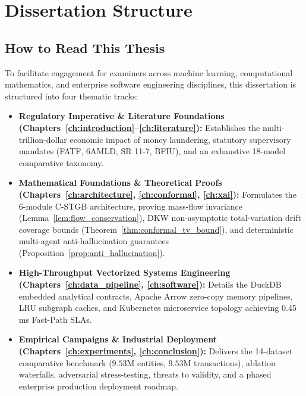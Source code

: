 \section{Dissertation Structure}

\subsection{How to Read This Thesis}
To facilitate engagement for examiners across machine learning, computational mathematics, and enterprise software engineering disciplines, this dissertation is structured into four thematic tracks:
\begin{itemize}
    \item \textbf{Regulatory Imperative \& Literature Foundations (Chapters~\ref{ch:introduction}--\ref{ch:literature}):} Establishes the multi-trillion-dollar economic impact of money laundering, statutory supervisory mandates (FATF, 6AMLD, SR 11-7, BFIU), and an exhaustive 18-model comparative taxonomy.
    \item \textbf{Mathematical Foundations \& Theoretical Proofs (Chapters~\ref{ch:architecture}, \ref{ch:conformal}, \ref{ch:xai}):} Formulates the 6-module C-STGB architecture, proving mass-flow invariance (Lemma~\ref{lem:flow_conservation}), DKW non-asymptotic total-variation drift coverage bounds (Theorem~\ref{thm:conformal_tv_bound}), and deterministic multi-agent anti-hallucination guarantees (Proposition~\ref{prop:anti_hallucination}).
    \item \textbf{High-Throughput Vectorized Systems Engineering (Chapters~\ref{ch:data_pipeline}, \ref{ch:software}):} Details the DuckDB embedded analytical contracts, Apache Arrow zero-copy memory pipelines, LRU subgraph caches, and Kubernetes microservice topology achieving 0.45\,ms Fast-Path SLAs.
    \item \textbf{Empirical Campaigns \& Industrial Deployment (Chapters~\ref{ch:experiments}, \ref{ch:conclusion}):} Delivers the 14-dataset comparative benchmark ($9.53\text{M}$ entities, $9.53\text{M}$ transactions), ablation waterfalls, adversarial stress-testing, threats to validity, and a phased enterprise production deployment roadmap.
\end{itemize}


